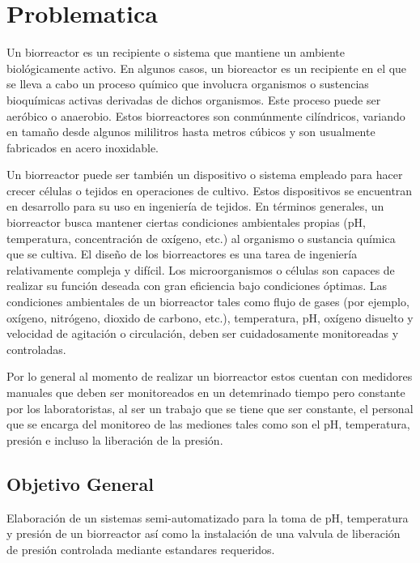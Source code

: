 \documentclass[letter,operight,12pt,spanish]{report}
\begin{document}
\maketitle

\section{Problematica}


Un biorreactor es un recipiente o sistema que mantiene un ambiente biol\'ogicamente activo. En algunos casos, un bioreactor es un recipiente en el que se lleva a cabo un proceso qu\'imico que involucra organismos o sustencias  bioqu\'imicas activas derivadas de dichos organismos. Este proceso puede ser aer\'obico o anaerobio. Estos biorreactores son conm\'unmente cil\'indricos, variando en tama\~no desde algunos mililitros hasta metros c\'ubicos y son usualmente fabricados en acero inoxidable.

Un biorreactor puede ser tambi\'en un dispositivo o sistema empleado para hacer crecer c\'elulas o tejidos en operaciones de cultivo. Estos dispositivos se encuentran  en desarrollo para su uso en ingenier\'ia de tejidos. En t\'erminos generales, un biorreactor busca mantener ciertas condiciones ambientales propias (pH, temperatura, concentraci\'on de ox\'igeno, etc.) al organismo o sustancia qu\'imica que se cultiva. El dise\~no de los biorreactores es una tarea de ingenier\'ia relativamente compleja y dif\'icil. Los microorganismos o c\'elulas  son capaces de realizar su funci\'on deseada con gran eficiencia bajo condiciones \'optimas. Las condiciones ambientales de un biorreactor tales como flujo de gases (por ejemplo, ox\'igeno, nitr\'ogeno, dioxido de carbono, etc.), temperatura, pH, ox\'igeno disuelto y velocidad de agitaci\'on o circulaci\'on, deben ser cuidadosamente monitoreadas y controladas.

Por lo general al momento de realizar un biorreactor estos cuentan con medidores manuales que deben ser monitoreados en un detemrinado tiempo pero constante por los laboratoristas, al ser un trabajo que se tiene que ser constante, el personal que se encarga del monitoreo de las mediones tales como son el pH, temperatura, presi\'on e incluso la liberaci\'on de la presi\'on. 

\subsection{Objetivo General}

Elaboraci\'on de un sistemas semi-automatizado para  la toma de pH, temperatura y presi\'on de un biorreactor as\'i como la instalaci\'on de una valvula de liberaci\'on de presi\'on controlada mediante estandares requeridos.
\end{document}
